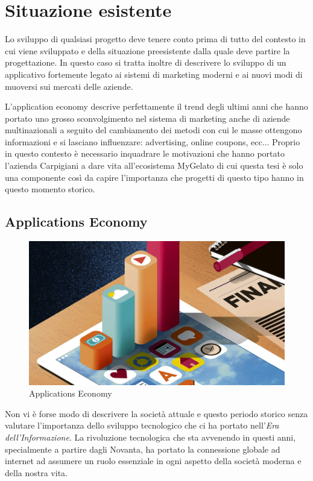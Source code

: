 \section{Situazione esistente}
Lo sviluppo di qualsiasi progetto deve tenere conto prima di tutto del contesto in cui viene sviluppato e della situazione preesistente dalla quale deve partire la progettazione.
In questo caso si tratta inoltre di descrivere lo sviluppo di un applicativo fortemente legato ai sistemi di marketing moderni e ai nuovi modi di muoversi sui mercati delle aziende.

L'application economy descrive perfettamente il trend degli ultimi anni che hanno portato uno grosso sconvolgimento nel sistema di marketing anche di aziende multinazionali a seguito del cambiamento dei metodi con cui le masse ottengono informazioni e si lasciano influenzare: advertising, online coupons, ecc...
Proprio in questo contesto è necessario inquadrare le motivazioni che hanno portato l'azienda Carpigiani a dare vita all'ecosistema MyGelato di cui questa tesi è solo una componente così da capire l'importanza che progetti di questo tipo hanno in questo momento storico.


\subsection{Applications Economy}
  
\begin{figure}[h!]
  \includegraphics[width=\linewidth]{images/The-App-Economy.jpg}
  \caption{Applications Economy}
  \label{fig:appEconomy1}
\end{figure}
  
Non vi è forse modo di descrivere la società attuale e questo periodo storico senza valutare l'importanza dello sviluppo tecnologico che ci ha portato nell'\textit{Era dell'Informazione}.
La rivoluzione tecnologica che sta avvenendo in questi anni, specialmente a partire dagli Novanta, ha portato la connessione globale ad internet ad assumere un ruolo essenziale in ogni aspetto della società moderna e della nostra vita.


